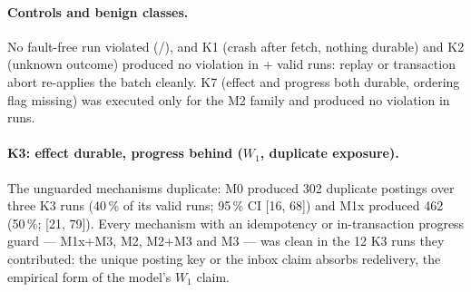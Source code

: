 \begin{table}[t]
\centering
\footnotesize
\caption{Violations by crash class (descriptive; $n$ valid runs, 95\,\% Clopper--Pearson interval).
The fault-free control and the classes that leave nothing durable or produce only unknown outcomes
are clean; the two windows that separate a durable effect from durable progress behave as the model
predicts.}
\label{tab:res-fault}

\end{table}

\begin{table}[t]
\centering
\footnotesize
\caption{Violations by mechanism (descriptive; $n$ valid runs, 95\,\% Clopper--Pearson interval).
The naive control violates under both windows; idempotency or ordering guards suppress duplicates
but no mechanism suppresses the lost-effect window.}
\label{tab:res-mech}

\end{table}

\paragraph{Controls and benign classes.} No fault-free run violated
(\ResFaultnoneViolatingRuns/\ResFaultnoneValidRuns), and K1 (crash after fetch, nothing durable) and
K2 (unknown outcome) produced no violation in \ResFaultKOneValidRuns{}+\ResFaultKTwoValidRuns{}
valid runs: replay or transaction abort re-applies the batch cleanly. K7 (effect and progress both
durable, ordering flag missing) was executed only for the M2 family and produced no violation in
\ResFaultKSevenValidRuns{} runs.

\paragraph{K3: effect durable, progress behind ($W_1$, duplicate exposure).} The unguarded
mechanisms duplicate: M0 produced 302 duplicate postings over three K3 runs (40\,\% of its valid
runs; 95\,\% CI [16, 68]) and M1x produced 462 (50\,\%; [21, 79]). Every mechanism with an
idempotency or in-transaction progress guard --- M1x+M3, M2, M2+M3 and M3 --- was clean in the 12
K3 runs they contributed: the unique posting key or the inbox claim absorbs redelivery, the
empirical form of the model's $W_1$ claim.

